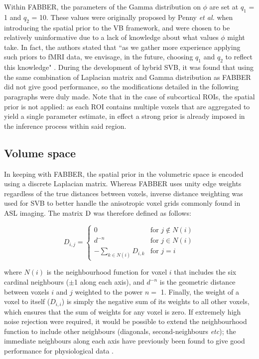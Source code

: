 Within FABBER, the parameters of the Gamma distribution on $\phi$ are set at $q_1$ = 1 and $q_2$ = 10. These values were originally proposed by Penny \textit{et al.} when introducing the spatial prior to the VB framework, and were chosen to be relatively uninformative due to a lack of knowledge about what values $\phi$ might take. In fact, the authors stated that ``as we gather more experience applying such priors to fMRI data, we envisage, in the future, choosing $q_1$ and $q_2$ to reflect this knowledge" \cite{Penny2005}. During the development of hybrid SVB, it was found that using the same combination of Laplacian matrix and Gamma distribution as FABBER did not give good performance, so the modifications detailed in the following paragraphs were duly made. Note that in the case of subcortical ROIs, the spatial prior is not applied: as each ROI contains multiple voxels that are aggregated to yield a single parameter estimate, in effect a strong prior is already imposed in the inference process within said region.  

\subsection{Volume space}

In keeping with FABBER, the spatial prior in the volumetric space is encoded using a discrete Laplacian matrix. Whereas FABBER uses unity edge weights regardless of the true distances between voxels, inverse distance weighting was used for SVB to better handle the anisotropic voxel grids commonly found in ASL imaging. The matrix $\mathrm{D}$ was therefore defined as follows: 

\begin{equation}
  D_{i,j} =
  \begin{cases}
    0 & \text{for } j \notin N(i) \\
    d^{-n} & \text{for } j \in N(i) \\
    -\sum\limits_{k \in N(i)} D_{i,k} & \text{for } j = i 
  \end{cases}
\end{equation}

where $N(i)$ is the neighbourhood function for voxel $i$ that includes the six cardinal neighbours ($\pm$1 along each axis), and $d^{-n}$ is the geometric distance between voxels $i$ and $j$ weighted to the power $n =$ 1. Finally, the weight of a voxel to itself ($D_{i,i}$) is simply the negative sum of its weights to all other voxels, which ensures that the sum of weights for any voxel is zero. If extremely high noise rejection were required, it would be possible to extend the neighbourhood function to include other neighbours (diagonals, second-neighbours \textit{etc}); the immediate neighbours along each axis have previously been found to give good performance for physiological data \cite{Chappell2011, Penny2005, Groves2009a}. 

